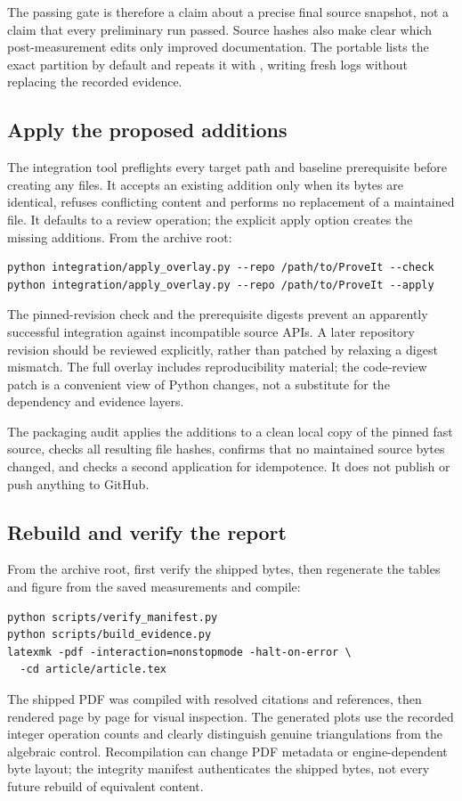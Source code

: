 The passing gate is therefore a claim about a precise final source snapshot,
not a claim that every preliminary run passed. Source hashes also make
clear which post-measurement edits only improved documentation.
The portable  lists the exact partition by
default and repeats it with , writing fresh logs without replacing
the recorded evidence.

\subsection{Apply the proposed additions}

The integration tool preflights every target path and baseline prerequisite
before creating any files. It accepts an existing addition only when its
bytes are identical, refuses conflicting content and performs no replacement
of a maintained file. It defaults to a review operation; the explicit apply
option creates the missing additions. From the archive root:

\begin{lstlisting}
python integration/apply_overlay.py --repo /path/to/ProveIt --check
python integration/apply_overlay.py --repo /path/to/ProveIt --apply
\end{lstlisting}

The pinned-revision check and the prerequisite digests prevent an apparently
successful integration against incompatible source APIs. A later repository
revision should be reviewed explicitly, rather than patched by relaxing a
digest mismatch. The full overlay includes reproducibility material;
the code-review patch is a convenient view of Python changes, not a substitute
for the dependency and evidence layers.

The packaging audit applies the additions to a clean local copy of the
pinned fast source, checks all resulting file hashes, confirms that no
maintained source bytes changed, and checks a second application for
idempotence. It does not publish or push anything to GitHub.

\subsection{Rebuild and verify the report}

From the archive root, first verify the shipped bytes, then regenerate
the tables and figure from the saved measurements and compile:

\begin{lstlisting}
python scripts/verify_manifest.py
python scripts/build_evidence.py
latexmk -pdf -interaction=nonstopmode -halt-on-error \
  -cd article/article.tex
\end{lstlisting}

The shipped PDF was compiled with resolved citations and references, then
rendered page by page for visual inspection. The generated plots use the
recorded integer operation counts and clearly distinguish genuine
triangulations from the algebraic control. Recompilation can change PDF
metadata or engine-dependent byte layout; the integrity manifest authenticates
the shipped bytes, not every future rebuild of equivalent content.
